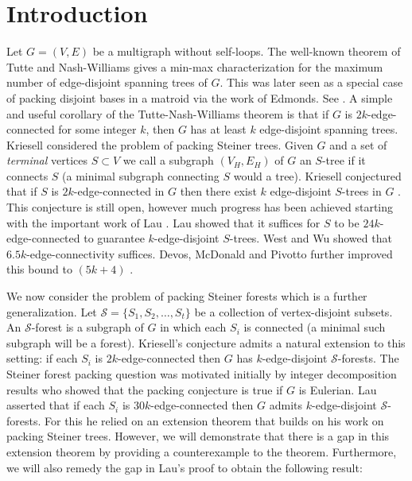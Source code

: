 \documentclass{article}
\begin{document}
\section{Introduction}
Let $G=(V,E)$ be a multigraph without self-loops. The well-known theorem of Tutte and Nash-Williams gives a min-max characterization for the maximum number of edge-disjoint spanning trees of $G$. This was later seen as a special case of packing disjoint bases in a matroid via the work of Edmonds. See \cite{Schrijver-book}. A simple and useful corollary of the Tutte-Nash-Williams theorem is that if $G$ is $2k$-edge-connected for some integer $k$, then $G$ has at least $k$ edge-disjoint spanning trees. Kriesell considered the problem of packing Steiner trees. Given $G$ and a set of \emph{terminal} vertices $S \subset V$ we call a subgraph $(V_H,E_H)$ of $G$ an 
$S$-tree if it connects $S$ (a minimal subgraph connecting $S$ would a tree). Kriesell conjectured that if $S$ is $2k$-edge-connected in $G$ then there exist $k$ edge-disjoint $S$-trees in $G$ \cite{Kriesell03}. This conjecture is still open, however much progress has been achieved starting with the important work of Lau \cite{lau2004approximate,lau-thesis}. Lau showed that it suffices for $S$ to be $24k$-edge-connected to guarantee $k$-edge-disjoint $S$-trees. West and Wu \cite{westwu} showed that $6.5k$-edge-connectivity suffices. Devos, McDonald and Pivotto further improved this bound to $(5k+4)$ \cite{devos2016packing}. %

We now consider the problem of packing Steiner forests which is a further generalization. Let $\mathcal{S} = \{S_1, S_2,\ldots,S_t\}$ be a collection of vertex-disjoint subsets. An $\mathcal{S}$-forest is a subgraph of $G$ in which each $S_i$ is connected (a minimal such subgraph will be a forest). Kriesell's conjecture admits a natural extension to this setting: if each $S_i$ is $2k$-edge-connected then $G$ has $k$-edge-disjoint $\mathcal{S}$-forests. The Steiner forest packing question was motivated initially by integer decomposition results \cite{chekuris09} who showed that the packing conjecture is true if $G$ is Eulerian. Lau \cite{lau2005packing,lau-thesis} asserted that if each $S_i$ is $30k$-edge-connected then $G$ admits $k$-edge-disjoint $\mathcal{S}$-forests. For this he relied on an extension theorem that builds on his work on packing Steiner trees. However, we will demonstrate that there is a gap in this extension theorem by providing a counterexample to the theorem. Furthermore, we will also remedy the gap in Lau's proof to obtain the following result:
\end{document}
